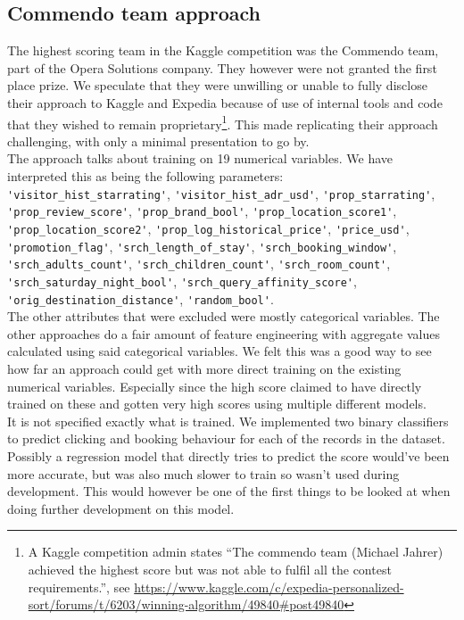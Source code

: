 \documentclass{llncs}
\begin{document}
\subsection{Commendo team approach}
The highest scoring team in the Kaggle competition was the Commendo team, part of the Opera Solutions company. They however were not granted the first place prize. We speculate that they were unwilling or unable to fully disclose their approach to Kaggle and Expedia because of use of internal tools and code that they wished to remain proprietary\footnote{A Kaggle competition admin states ``The commendo team (Michael Jahrer) achieved the highest score but was not able to fulfil all the contest requirements.'', see \url{https://www.kaggle.com/c/expedia-personalized-sort/forums/t/6203/winning-algorithm/49840#post49840}}. This made replicating their approach challenging, with only a minimal presentation to go by\cite{Jahrer2013}.\\
The approach talks about training on 19 numerical variables. We have interpreted this as being the following parameters:\\
\verb!'visitor_hist_starrating'!, \verb!'visitor_hist_adr_usd'!, \verb!'prop_starrating'!, \verb!'prop_review_score'!, \verb!'prop_brand_bool'!, \verb!'prop_location_score1'!, \verb!'prop_location_score2'!, \verb!'prop_log_historical_price'!, \verb!'price_usd'!, \verb!'promotion_flag'!, \verb!'srch_length_of_stay'!, \verb!'srch_booking_window'!, \verb!'srch_adults_count'!, \verb!'srch_children_count'!, \verb!'srch_room_count'!, \verb!'srch_saturday_night_bool'!, \verb!'srch_query_affinity_score'!, \verb!'orig_destination_distance'!, \verb!'random_bool'!. \\
The other attributes that were excluded were mostly categorical variables. The other approaches do a fair amount of feature engineering with aggregate values calculated using said categorical variables. We felt this was a good way to see how far an approach could get with more direct training on the existing numerical variables. Especially since the high score claimed to have directly trained on these and gotten very high scores using multiple different models.\\
It is not specified exactly what is trained. We implemented two binary classifiers to predict clicking and booking behaviour for each of the records in the dataset. Possibly a regression model that directly tries to predict the score would've been more accurate, but was also much slower to train so wasn't used during development. This would however be one of the first things to be looked at when doing further development on this model.\\
\end{document}
